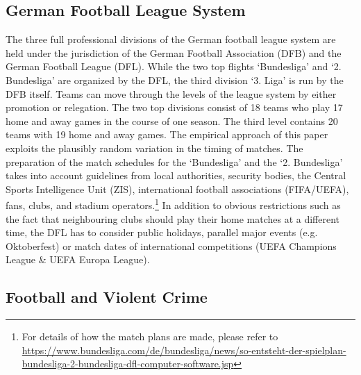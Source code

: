 \documentclass[11pt, a4paper]{article} %
\begin{document}
\subsection{German Football League System}
The three full professional divisions of the German football league system are held under the jurisdiction of the German Football Association (DFB) and the German Football League (DFL). While the two top flights `Bundesliga' and `2. Bundesliga' are organized by the DFL, the third division `3. Liga' is run by the DFB itself. Teams can move through the levels of the league system by either promotion or relegation. The two top divisions consist of 18 teams who play 17 home and away games in the course of one season. The third level contains 20 teams with 19 home and away games. The empirical approach of this paper exploits the plausibly random variation in the timing of matches. The preparation of the match schedules for the `Bundesliga' and the `2. Bundesliga' takes into account guidelines from local authorities, security bodies, the Central Sports Intelligence Unit (ZIS), international football associations (FIFA/UEFA), fans, clubs, and stadium operators.\footnote{For details of how the match plans are made, please refer to \href{https://www.bundesliga.com/de/bundesliga/news/so-entsteht-der-spielplan-bundesliga-2-bundesliga-dfl-computer-software.jsp}{https://www.bundesliga.com/de/bundesliga/news/so-entsteht-der-spielplan-bundesliga-2-bundesliga-dfl-computer-software.jsp}} In addition to obvious restrictions such as the fact that neighbouring clubs should play their home matches at a different time, the DFL has to consider public holidays, parallel major events (e.g. Oktoberfest) or match dates of international competitions (UEFA Champions League \& UEFA Europa League).



\subsection{Football and Violent Crime}
\end{document}
